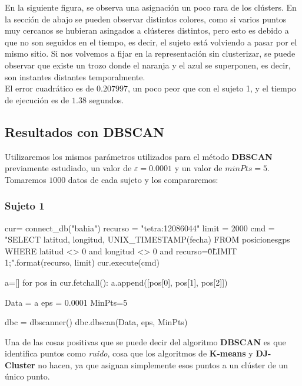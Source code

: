 \documentclass[a4paper, 12pt]{article}
\begin{document}
En la siguiente figura, se observa una asignaci\'on un poco rara de los cl\'usters. En la secci\'on de abajo se pueden observar distintos colores, como si varios puntos muy cercanos se hubieran asingados a cl\'usteres distintos, pero esto es debido a que no son seguidos en el tiempo, es decir, el sujeto est\'a volviendo a pasar por el mismo sitio. Si nos volvemos a fijar en la representaci\'on sin clusterizar, se puede observar que existe un trozo donde el naranja y el azul se superponen, es decir, son instantes distantes temporalmente.\\

El error cuadr\'atico es de $0.207997$, un poco peor que con el sujeto 1, y el tiempo de ejecuci\'on es de $1.38$ segundos.\\

\pagebreak
\subsection{Resultados con DBSCAN}

Utilizaremos los mismos par\'ametros utilizados para el m\'etodo \textbf{DBSCAN} previamente estudiado, un valor de $\varepsilon = 0.0001$ y un valor de $minPts = 5$. Tomaremos $1000$ datos de cada sujeto y los compararemos:\\

\subsubsection{Sujeto 1}

\begin{python}
cur= connect_db("bahia")
recurso = "tetra:12086044"
limit = 2000
cmd = "SELECT latitud, longitud, UNIX_TIMESTAMP(fecha) 
	FROM posicionesgps 
	WHERE latitud <> 0 and longitud <> 0 and recurso=\"{0}\" 
	LIMIT {1};".format(recurso, limit)
cur.execute(cmd)

a=[]
for pos in cur.fetchall():
    a.append([pos[0], pos[1], pos[2]])

Data = a
eps = 0.0001
MinPts=5

dbc = dbscanner()
dbc.dbscan(Data, eps, MinPts)
\end{python}

\bigskip

Una de las cosas positivas que se puede decir del algoritmo \textbf{DBSCAN} es que identifica puntos como \textit{ruido}, cosa que los algoritmos de \textbf{K-means} y \textbf{DJ-Cluster} no hacen, ya que asignan simplemente esos puntos a un cl\'uster de un \'unico punto.\\
\end{document}
